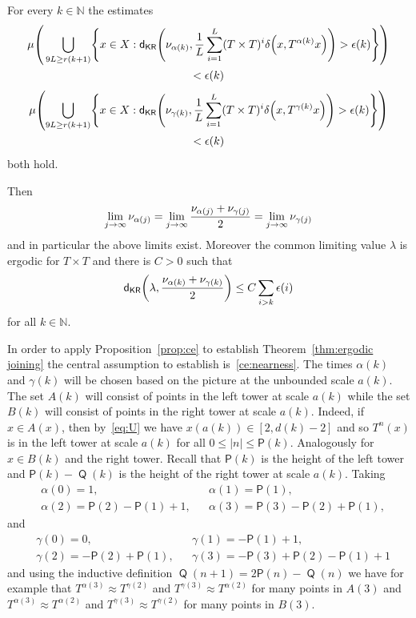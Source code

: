 \documentclass[AHL,Unicode,longabstracts,published]{cedram}
\DeclareMathOperator{\Q}{\mathsf{Q}}
\newcommand{\N}{\mathbb{N}}
\newcommand{\metric}{\mathsf{d}}
\newcommand{\KR}{\mathsf{KR}}
\renewcommand{\P}{\mathsf{P}}
\let\originalleft\left
\let\originalright\right
\renewcommand{\left}{\mathopen{}\mathclose\bgroup\originalleft}
\renewcommand{\right}{\aftergroup\egroup\originalright}
\renewcommand*{\to}{\mathchoice{\longrightarrow}{\rightarrow}{\rightarrow}{\rightarrow}}
\begin{document}
\begin{prop}
\begin{enumerate}
For every $k \in \N$ the estimates
\begin{multline}\label{eq:ce changed}
\mu \left(\, \bigcup_{9L \ge r(k+1)} \left\{ x \in X : \metric_\KR \left(\nu_{\alpha(k)}, \frac{1}{L} \sum_{i=1}^L (T \times T)^i \delta\left(x,T^{\alpha(k)} x\right) \right) > \epsilon(k) \right\} \right) \\ < \epsilon(k)
\end{multline}
\begin{multline}\label{eq:ce changed 2}
\mu \left(\bigcup_{9L \ge r(k+1)} \left\{ x \in X : \metric_\KR \left(\nu_{\gamma(k)}, \frac{1}{L} \sum_{i=1}^L (T \times T)^i \delta\left(x,T^{\gamma(k)} x\right) \right) > \epsilon(k) \right\} \right)\\ 
< \epsilon(k)
\end{multline}
both hold.
\end{enumerate}
Then
\[
\lim_{j \to \infty} \nu_{\alpha(j)} = \lim_{j \to \infty} \frac{\nu_{\alpha(j)} + \nu_{\gamma(j)}}{2} = \lim_{j \to \infty} \nu_{\gamma(j)}
\]
and in particular the above limits exist. Moreover the common limiting value $\lambda$ is ergodic for $T \times T$ and there is $C > 0$ such that
\[
\metric_\KR \left(\lambda, \frac{\nu_{\alpha(k)} + \nu_{\gamma(k)}}{2} \right) \le C \sum_{i > k} \epsilon(i)
\]
for all $k \in \N$.
\end{prop}


In order to apply Proposition~\ref{prop:ce} to establish Theorem~\ref{thm:ergodic joining} the central assumption to establish is~\eqref{ce:nearness}. The times $\alpha(k)$ and $\gamma(k)$ will be chosen based on the picture at the unbounded scale $a(k)$. The set $A(k)$ will consist of points in the left tower at scale $a(k)$ while the set $B(k)$ will consist of points in the right tower at scale $a(k)$. Indeed, if $x \in A(x)$, then by~\eqref{eq:U} we have $x(a(k))\in [2,d(k)-2]$ and so $T^n(x)$ is in the left tower at scale $a(k)$ for all $0\leq |n|\leq \P(k)$. Analogously for $x \in B(k)$ and the right tower. Recall that $\P(k)$ is the height of the left tower and $\P(k) - \Q(k)$ is the height of the right tower at scale $a(k)$. Taking
\begin{align*}
&\alpha(0) = 1,
&&\alpha(1) = \P(1),
\\
&\alpha(2) = \P(2) - \P(1) + 1,
&&\alpha(3) = \P(3) - \P(2) + \P(1),
\end{align*}
and
\begin{align*}
&\gamma(0) = 0,
&&\gamma(1) = - \P(1) + 1,
\\
&\gamma(2) = - \P(2) + \P(1),
&&\gamma(3) = -\P(3) + \P(2) - \P(1) + 1
\end{align*}
and using the inductive definition $\Q(n+1) = 2\P(n) - \Q(n)$ we have for example that $T^{\alpha(3)} \approx T^{\gamma(2)}$ and $T^{\gamma(3)} \approx T^{\alpha(2)}$ for many points in $A(3)$ and $T^{\alpha(3)} \approx T^{\alpha(2)}$ and $T^{\gamma(3)} \approx T^{\gamma(2)}$ for many points in $B(3)$.
\end{document}
